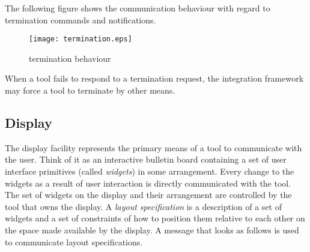 \documentclass{article}
\begin{document}
   The following figure shows the communication behaviour with regard to
   termination commands and notifications.

   \begin{figure}[H]
    \begin{center}
     \texttt{[image: termination.eps]}
    \end{center}
    \vspace{-0.5cm}
    \caption{termination behaviour}
   \end{figure}

   \noindent When a tool fails to respond to a termination request, the
   integration framework may force a tool to terminate by other means.

  \subsection{Display} \label{ss:user_interaction}

   The display facility represents the primary means of a tool to communicate
   with the user.  Think of it as an interactive bulletin board containing a
   set of user interface primitives (called \textit{widgets}) in some
   arrangement.  Every change to the widgets as a result of user interaction is
   directly communicated with the tool.  The set of widgets on the display and
   their arrangement are controlled by the tool that owns the display.  A
   \textit{layout specification} is a description of a set of widgets and a set
   of constraints of how to position them relative to each other on the space
   made available by the display. A message that looks as follows is used to
   communicate layout specifications.
\end{document}
